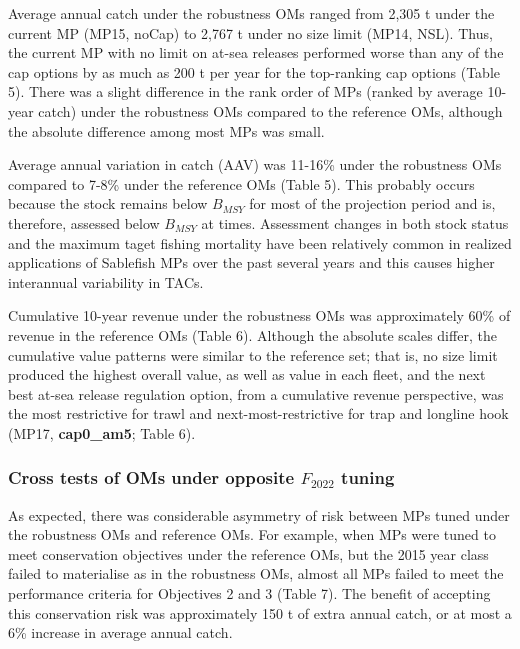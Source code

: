 \documentclass[11pt]{book}
\begin{document}
Average annual catch under the robustness OMs ranged from 2,305 t under the current MP (MP15, noCap) to 2,767 t under no size limit (MP14, NSL). Thus, the current MP with no limit on at-sea releases performed worse than any of the cap options by as much as 200 t per year for the top-ranking cap options (Table 5). There was a slight difference in the rank order of MPs (ranked by average 10-year catch) under the robustness OMs compared to the reference OMs, although the absolute difference among most MPs was small.

Average annual variation in catch (AAV) was 11-16\% under the robustness OMs compared to 7-8\% under the reference OMs (Table 5). This probably occurs because the stock remains below \(B_{MSY}\) for most of the projection period and is, therefore, assessed below \(B_{MSY}\) at times. Assessment changes in both stock status and the maximum taget fishing mortality have been relatively common in realized applications of Sablefish MPs over the past several years and this causes higher interannual variability in TACs.

Cumulative 10-year revenue under the robustness OMs was approximately 60\% of revenue in the reference OMs (Table 6). Although the absolute scales differ, the cumulative value patterns were similar to the reference set; that is, no size limit produced the highest overall value, as well as value in each fleet, and the next best at-sea release regulation option, from a cumulative revenue perspective, was the most restrictive for trawl and next-most-restrictive for trap and longline hook (MP17, \textbf{cap0\_am5}; Table 6).

\hypertarget{cross-tests-of-oms-under-opposite-f_2022-tuning}{%
\subsubsection{\texorpdfstring{Cross tests of OMs under opposite \(F_{2022}\) tuning}{Cross tests of OMs under opposite F\_\{2022\} tuning}}\label{cross-tests-of-oms-under-opposite-f_2022-tuning}}

As expected, there was considerable asymmetry of risk between MPs tuned under the robustness OMs and reference OMs. For example, when MPs were tuned to meet conservation objectives under the reference OMs, but the 2015 year class failed to materialise as in the robustness OMs, almost all MPs failed to meet the performance criteria for Objectives 2 and 3 (Table 7). The benefit of accepting this conservation risk was approximately 150 t of extra annual catch, or at most a 6\% increase in average annual catch.
\end{document}
